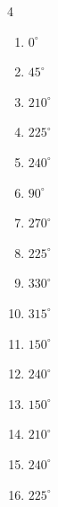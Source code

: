 \begin{multicols}{4}
\begin{enumerate}
  \item $\displaystyle 0^{\circ}$
        \phantom{$\displaystyle =0$}

  \item $\displaystyle 45^{\circ}$

  \item $\displaystyle 210^{\circ}$

  \item $\displaystyle 225^{\circ}$

  \item $\displaystyle 240^{\circ}$

  \item $\displaystyle 90^{\circ}$

  \item $\displaystyle 270^{\circ}$

  \item $\displaystyle 225^{\circ}$

  \item $\displaystyle 330^{\circ}$

  \item $\displaystyle 315^{\circ}$

  \item $\displaystyle 150^{\circ}$

  \item $\displaystyle 240^{\circ}$

  \item $\displaystyle 150^{\circ}$

  \item $\displaystyle 210^{\circ}$

  \item $\displaystyle 240^{\circ}$

  \item $\displaystyle 225^{\circ}$


\end{enumerate}
\end{multicols}
